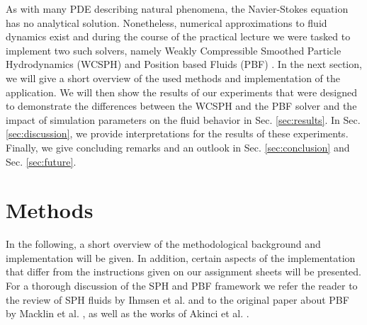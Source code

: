 \documentclass[11pt, letterpaper, twocolumn]{article}
\begin{document}
As with many PDE describing natural phenomena, the Navier-Stokes equation has no analytical solution. Nonetheless, numerical approximations to fluid dynamics exist and during the course of the practical lecture we were tasked to implement two such solvers, namely Weakly Compressible Smoothed Particle Hydrodynamics (WCSPH) \cite{ihmsen2014} and Position based Fluids (PBF) \cite{macklin2013}. 
In the next section, we will give a short overview of the used methods and implementation of the application.
We will then show the results of our experiments that were designed to demonstrate the differences between the WCSPH and the PBF solver and the impact of simulation parameters on the fluid behavior in Sec. \ref{sec:results}. In Sec. \ref{sec:discussion}, we provide interpretations for the 
results of these experiments. Finally, we give concluding remarks and an outlook in Sec. \ref{sec:conclusion} and Sec. \ref{sec:future}.



\section{Methods} \label{sec:methods}
In the following, a short overview of the methodological background and implementation will be given. In addition, certain aspects of the implementation that differ from the instructions given on our assignment sheets will be presented.
For a thorough discussion of the SPH and PBF framework we refer the reader to the review of SPH fluids by Ihmsen et al. \cite{ihmsen2014} and to the original paper about PBF by Macklin et al. \cite{macklin2013}, as well as the works of Akinci et al. \cite{akinci2012, akinci2013}.
\end{document}
